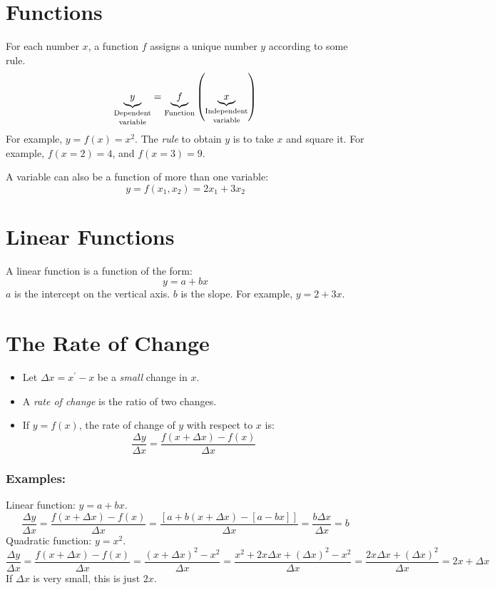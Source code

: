 \documentclass[10pt]{article}
\begin{document}
\section{Functions}
For each number $x$, a function $f$ assigns a unique number $y$ according to some rule.
\begin{equation*}
  \underbrace{y}_{\text{\shortstack{Dependent\\variable}}} = \underbrace{f}_{\text{Function}} \left( \underbrace{x}_{\text{\shortstack{Independent\\variable}}} \right)
\end{equation*}
For example, $y=f\left( x \right)=x^2$. The \emph{rule} to obtain $y$ is to take $x$ and square it. For example, $f\left( x=2 \right) = 4$, and $f\left( x=3 \right)=9$.

A variable can also be a function of more than one variable:
\begin{equation*}
  y=f\left( x_1,x_2 \right)=2x_1 + 3x_2
\end{equation*}
\section{Linear Functions}
A linear function is a function of the form:
\begin{equation*}
  y = a + bx
\end{equation*}
$a$ is the intercept on the vertical axis. $b$ is the slope. For example, $y=2+3x$.
\section{The Rate of Change}
\begin{itemize}
  \item Let $\Delta x = x^\prime - x$ be a \emph{small} change in $x$.
  \item A \emph{rate of change} is the ratio of two changes.
  \item If $y=f\left( x \right)$, the rate of change of $y$ with respect to $x$ is:
    \begin{equation*}
      \frac{\Delta y}{\Delta x} = \frac{f\left( x+\Delta x \right)- f\left( x \right)}{\Delta x}
    \end{equation*}
\end{itemize}
\subsubsection*{Examples:}
Linear function: $y=a+bx$.
  \begin{equation*}
    \frac{\Delta y}{\Delta x} = \frac{f\left( x+\Delta x \right)- f\left( x \right)}{\Delta x}=\frac{\left[ a + b\left( x+\Delta x \right)-\left[ a-bx \right] \right]}{\Delta x} = \frac{b\Delta x }{\Delta x} = b
  \end{equation*}
Quadratic function: $y=x^2$.
  \begin{equation*}
  \frac{\Delta y}{\Delta x} = \frac{f\left( x+\Delta x \right)- f\left( x \right)}{\Delta x}=\frac{\left( x+\Delta x \right)^2 - x^2}{\Delta x}=\frac{x^2 + 2x\Delta x+\left( \Delta x \right)^2 - x^2}{\Delta x} = \frac{2x\Delta x+\left( \Delta x \right)^2}{\Delta x}=2x + \Delta x
  \end{equation*}
If $\Delta x$ is very small, this is just $2x$.
\end{document}
